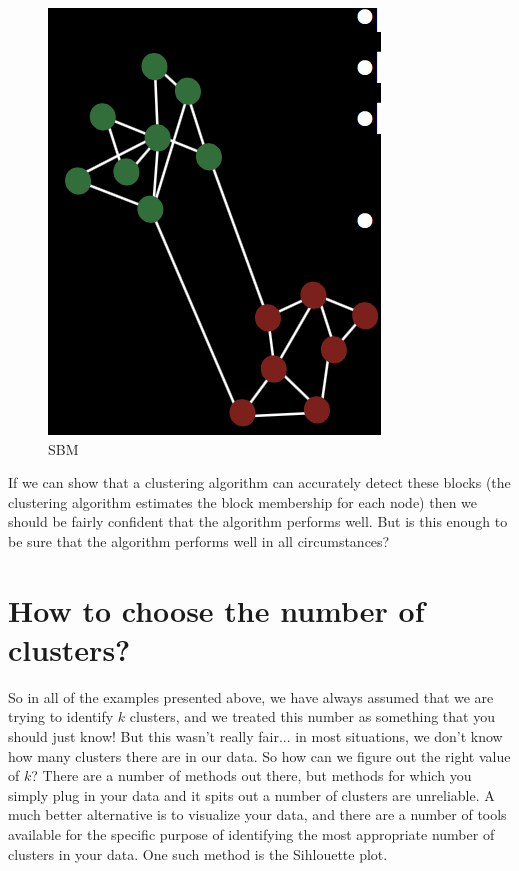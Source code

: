 \begin{figure}[H]
\begin{center}
\includegraphics[scale=0.4]{SBM.png}
\end{center}
\caption{SBM}
\label{fig:sbm}
\end{figure}


If we can show that a clustering algorithm can accurately detect these blocks (the clustering algorithm estimates the block membership for each node) then we should be fairly confident that the algorithm performs well. But is this enough to be sure that the algorithm performs well in all circumstances?


\section{How to choose the number of clusters?}

So in all of the examples presented above, we have always assumed that we are trying to identify $k$ clusters, and we treated this number as something that you should just know! But this wasn't really fair... in most situations, we don't know how many clusters there are in our data. So how can we figure out the right value of $k$? There are a number of methods out there, but methods for which you simply plug in your data and it spits out a number of clusters are unreliable. A much better alternative is to visualize your data, and there are a number of tools available for the specific purpose of identifying the most appropriate number of clusters in your data. One such method is the Sihlouette plot.

